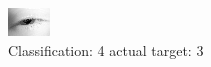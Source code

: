 \begin{figure}[h!]
\begin{center}
\includegraphics[width=0.60\columnwidth]{figures/ID104_class_4_target_3.png}
\end{center}
\caption{ Classification: 4 actual target: 3}
\label{fig:ID104_class_4_target_3}
\end{figure}

